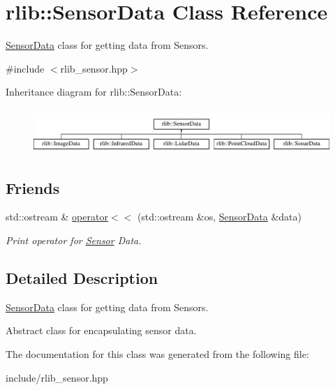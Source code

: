 \hypertarget{classrlib_1_1SensorData}{\section{rlib\-:\-:Sensor\-Data Class Reference}
\label{classrlib_1_1SensorData}
}


\hyperlink{classrlib_1_1SensorData}{Sensor\-Data} class for getting data from Sensors.  




{\ttfamily \#include $<$rlib\-\_\-sensor.\-hpp$>$}

Inheritance diagram for rlib\-:\-:Sensor\-Data\-:\begin{figure}[H]
\begin{center}
\leavevmode
\includegraphics[height=1.709924cm]{classrlib_1_1SensorData}
\end{center}
\end{figure}
\subsection*{Friends}
\begin{DoxyCompactItemize}
\item 
\hypertarget{classrlib_1_1SensorData_a36d6b9ae4a89f39cedf76c76814c96ae}{std\-::ostream \& \hyperlink{classrlib_1_1SensorData_a36d6b9ae4a89f39cedf76c76814c96ae}{operator$<$$<$} (std\-::ostream \&os, \hyperlink{classrlib_1_1SensorData}{Sensor\-Data} \&data)}\label{classrlib_1_1SensorData_a36d6b9ae4a89f39cedf76c76814c96ae}

\begin{DoxyCompactList}\small\item\em Print operator for \hyperlink{classrlib_1_1Sensor}{Sensor} Data. \end{DoxyCompactList}\end{DoxyCompactItemize}


\subsection{Detailed Description}
\hyperlink{classrlib_1_1SensorData}{Sensor\-Data} class for getting data from Sensors. 

Abstract class for encapsulating sensor data. 

The documentation for this class was generated from the following file\-:\begin{DoxyCompactItemize}
\item 
include/rlib\-\_\-sensor.\-hpp\end{DoxyCompactItemize}
